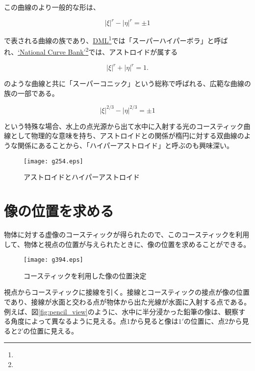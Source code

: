\documentclass[twocolumn]{article}
\begin{document}
	この曲線のより一般的な形は、
	
	$$ \left| \xi \right|^{r} - \left| \eta \right|^{r} = \pm1 $$
	
	で表される曲線の族であり、\href{http://dynamicmathematicslearning.com/super-ellipse.html}{DML}\footnote{}では「スーパーハイパーボラ」と呼ばれ、\href{https://old.nationalcurvebank.org/superconicncb/superconicncbb.htm}{`National Curve Bank'}\footnote{}では、アストロイドが属する
	
	$$ \left| \xi \right|^{r} + \left| \eta \right|^{r} = 1. $$
	
	のような曲線と共に「スーパーコニック」という総称で呼ばれる、広範な曲線の族の一部である。
	
	$$ \left| \xi \right|^{2/3} - \left| \eta \right|^{2/3} = \pm1 $$
	
	という特殊な場合、水上の点光源から出て水中に入射する光のコースティック曲線として物理的な意味を持ち、アストロイドとの関係が楕円に対する双曲線のような関係にあることから、「ハイパーアストロイド」と呼ぶのも興味深い。
	
	\begin{figure}
		\centering
		\texttt{[image: g254.eps]}
		\caption{アストロイドとハイパーアストロイド}
		\label{fig:hyperastroid}
	\end{figure}
	
	\section{像の位置を求める}
	
	物体に対する虚像のコースティックが得られたので、このコースティックを利用して、物体と視点の位置が与えられたときに、像の位置を求めることができる。
	
	\begin{figure}[ht]
		\centering
		\texttt{[image: g394.eps]}
		\caption{コースティックを利用した像の位置決定}
		\label{fig:image_caustic}
	\end{figure}
	
	視点からコースティックに接線を引く。接線とコースティックの接点が像の位置であり、接線が水面と交わる点が物体から出た光線が水面に入射する点である。
	例えば、図\ref{fig:pencil_view}のように、水中に半分浸かった鉛筆の像は、観察する角度によって異なるように見える。点$1$から見ると像は$1'$の位置に、点$2$から見ると$2'$の位置に見える。
	
\end{document}
